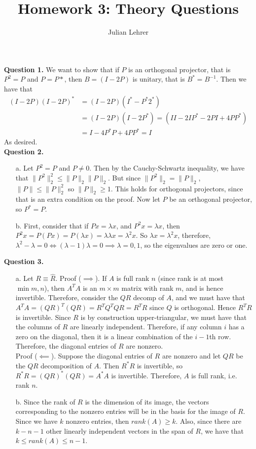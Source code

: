 \documentclass{article}
\title{Homework 3: Theory Questions}
\date{}
\author{Julian Lehrer}
\begin{document}
\maketitle
\textbf{Question 1.} We want to show that if $P$ is an orthogonal projector, that is $P^2=P$ and $P=P*$, then $B=(I-2P)$ is unitary, that is $B^* = B^{-1}$. Then we have that 
\begin{align*}
    (I-2P)(I-2P)^* &= (I-2P)(I^*-P^*2^*)\\
    &=(I-2P)(I-2P^*) = (II - 2IP^* - 2PI+4PP^*)\\
    &= I - 4P^*P + 4PP^* = I
\end{align*}
As desired. \\

\textbf{Question 2.}
\begin{itemize}
    \item[a.] Let $P^2=P$ and $P \neq 0$. Then by the Cauchy-Schwartz inequality, we have that $\|P^2\|^2_2 \leq \|P\|_2 \|P\|_2$. But since $\|P^2\|_2 = \|P\|_2$, $\|P\| \leq \|P\|_2^{2}$ so $\|P\|_2 \geq 1$. This holds for orthogonal projectors, since that is an extra condition on the proof. Now let $P$ be an orthogonal projector, so $P^* = P$. 
    \item[b.] First, consider that if $Px=\lambda x$, and $P^2x = \lambda x$, then $P^2x = P(Px) = P(\lambda x) = \lambda \lambda x = \lambda^2 x$. So $\lambda x= \lambda^2x$, therefore, $\lambda^2-\lambda = 0 \iff (\lambda-1)\lambda = 0 \implies \lambda = 0,1$, so the eigenvalues are zero or one. 
\end{itemize}

\textbf{Question 3.}
\begin{itemize}
    \item[a.] Let $R \equiv \hat{R}$.
    Proof ($\implies$). If $A$ is full rank $n$ (since rank is at most $\min{m, n}$), then $A^TA$ is an $m \times m$ matrix with rank $m$, and is hence invertible. Therefore, consider the $QR$ decomp of $A$, and we must have that $A^TA = (QR)^T(QR)=R^TQ^TQR = R^TR$ since $Q$ is orthogonal. Hence $R^TR$ is invertible. Since $R$ is by construction upper-triangular, we must have that the columns of $R$ are linearly independent. Therefore, if any column $i$ has a zero on the diagonal, then it is a linear combination of the $i-1$th row. Therefore, the diagonal entries of $R$ are nonzero. \\
    Proof ($\impliedby$). Suppose the diagonal entries of $R$ are nonzero and let $QR$ be the $QR$ decomposition of $A$. Then $R^*R$ is invertible, so $R^*R = (QR)^*(QR) = A^*A$ is invertible. Therefore, $A$ is full rank, i.e. rank $n$. 
    \item[b.] Since the rank of $R$ is the dimension of its image, the vectors corresponding to the nonzero entries will be in the basis for the image of $R$. Since we have $k$ nonzero entries, then $rank(A) \geq k$. Also, since there are $k-n-1$ other linearly independent vectors in the span of $R$, we have that $k \leq rank(A) \leq n-1$.
\end{itemize}
\end{document}
